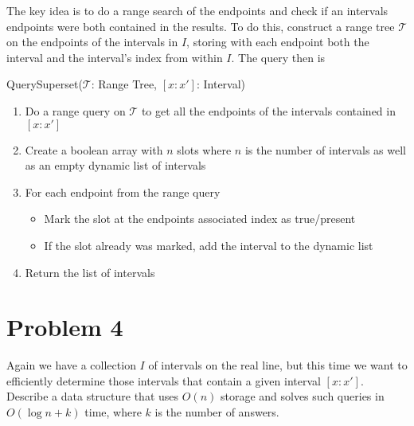 \documentclass[12pt]{extarticle}
\begin{document}
\begin{solution}
    The key idea is to do a range search of the endpoints and check if an intervals endpoints were both contained in the results. To do this, construct a range tree $\mathcal{T}$ on the endpoints of the intervals in $I$, storing with each endpoint both the interval and the interval's index from within $I$. The query then is
    \begin{algorithm}[H]
        \caption{QuerySuperset($\mathcal{T}$: Range Tree, $[x : x']$: Interval)}
        \begin{enumerate}
            \item Do a range query on $\mathcal{T}$ to get all the endpoints of the intervals contained in $[x : x']$
            \item Create a boolean array with $n$ slots where $n$ is the number of intervals as well as an empty dynamic list of intervals
            \item For each endpoint from the range query
                \begin{itemize}
                    \item Mark the slot at the endpoints associated index as true/present
                    \item If the slot already was marked, add the interval to the dynamic list
                \end{itemize}
            \item Return the list of intervals
        \end{enumerate}
    \end{algorithm}
\end{solution}

\section*{Problem 4}
Again we have a collection $I$ of intervals on the real line, but this time we want to efficiently determine those intervals that contain a given interval $[x : x']$. Describe a data structure that uses $O(n)$ storage and solves such queries in $O(\log n + k)$ time, where $k$ is the number of answers.
\end{document}
